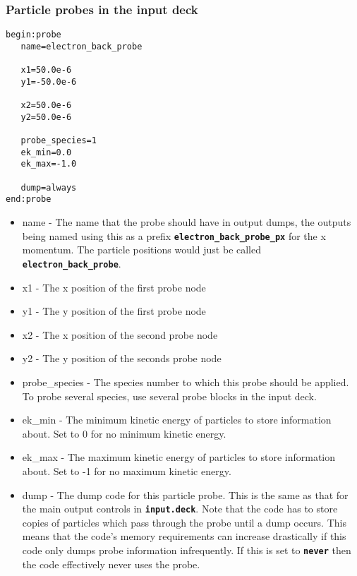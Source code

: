 \documentclass[12pt,a4paper]{article}
\newcommand{\simpleboxverbatim}{\begin{Verbatim}[obeytabs=true,frame=single,
  framerule=0.5mm,rulecolor=\color{warwickmid},formatcom=\color{black}]}
\newcommand{\inlinecode}[1]{{\color{warwickred} \bf\texttt{#1}}}
\begin{document}
\subsubsection{Particle probes in the input deck}
\simpleboxverbatim
begin:probe
   name=electron_back_probe

   x1=50.0e-6
   y1=-50.0e-6

   x2=50.0e-6
   y2=50.0e-6

   probe_species=1
   ek_min=0.0
   ek_max=-1.0

   dump=always
end:probe
\end{Verbatim}
\begin{itemize}
\item name - The name that the probe should have in output dumps, the outputs
  being named using this as a prefix \inlinecode{electron\_back\_probe\_px}
  for the x momentum. The particle positions would just be called
  \inlinecode{electron\_back\_probe}.
\item x1 - The x position of the first probe node
\item y1 - The y position of the first probe node
\item x2 - The x position of the second probe node
\item y2 - The y position of the seconds probe node
\item probe\_species - The species number to which this probe should be
  applied. To probe several species, use several probe blocks in the input
  deck.
\item ek\_min - The minimum kinetic energy of particles to store information
  about. Set to 0 for no minimum kinetic energy.
\item ek\_max - The maximum kinetic energy of particles to store information
  about. Set to -1 for no maximum kinetic energy.
\item dump - The dump code for this particle probe. This is the same as that
  for the main output controls in \inlinecode{input.deck}. Note that the code
  has to store copies of particles which pass through the probe until a dump
  occurs. This means that the code's memory requirements can increase
  drastically if this code only dumps probe information infrequently. If this
  is set to \inlinecode{never} then the code effectively never uses the probe.
\end{itemize}
\end{document}

